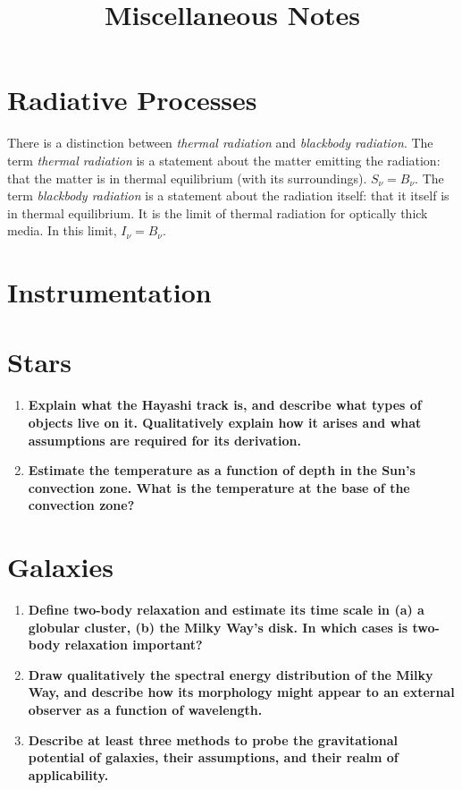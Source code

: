 \documentclass[12pt, letterpaper, preprint]{aastex}
\begin{document}
\title{Miscellaneous Notes}

\section*{Radiative Processes}

There is a distinction between \emph{thermal radiation}
and \emph{blackbody radiation}.
The term \emph{thermal radiation} is a statement about the
matter emitting the radiation: that the matter is in thermal
equilibrium (with its surroundings).
$S_\nu = B_\nu$.
The term \emph{blackbody radiation} is a statement about the
radiation itself: that it itself is in thermal equilibrium.
It is the limit of thermal radiation for optically thick media.
In this limit, $I_\nu = B_\nu$.

\section*{Instrumentation}

\section*{Stars}
\begin{enumerate}
  \item \textbf{Explain what the Hayashi track is, 
      and describe what types of objects live on it.
      Qualitatively explain how it arises and what 
      assumptions are required for its derivation.}
  \item \textbf{Estimate the temperature as a function 
      of depth in the Sun’s convection zone.
      What is the temperature at the base of the convection zone?}
\end{enumerate}

\section*{Galaxies}

\begin{enumerate}

\item \textbf{Define two-body relaxation and estimate its time scale in (a) a globular cluster, (b) the Milky Way's disk. In which cases is two-body relaxation important?}

\item \textbf{Draw qualitatively the spectral energy distribution of the Milky Way, and describe how its morphology might appear to an external observer as a function of wavelength.}

\item \textbf{Describe at least three methods to probe the gravitational potential of galaxies, their assumptions, and their realm of applicability.}

\end{enumerate}
\end{document}
